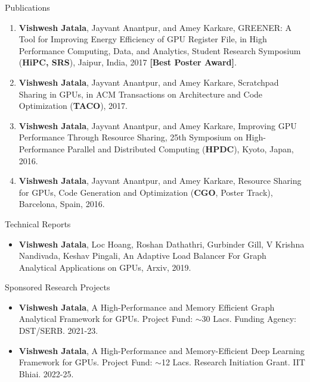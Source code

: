 \documentclass{resume} %
\begin{document}
\begin{rSection}{Publications}
\begin{enumerate}
\item \textbf{Vishwesh Jatala}, Jayvant Anantpur, and Amey Karkare, GREENER: A Tool for Improving Energy Efficiency of GPU Register File, in High Performance Computing, Data, and Analytics, Student Research Symposium (\textbf{HiPC, SRS}), Jaipur, India, 2017 \textbf{[Best Poster Award]}. 
\item \textbf{Vishwesh Jatala}, Jayvant Anantpur, and Amey Karkare, Scratchpad Sharing in GPUs, in ACM Transactions on Architecture and Code Optimization (\textbf{TACO}), 2017. 
\item \textbf{Vishwesh Jatala}, Jayvant Anantpur, and Amey Karkare, Improving GPU Performance Through Resource Sharing, 25th Symposium on High-Performance Parallel and Distributed Computing (\textbf{HPDC}), Kyoto, Japan, 2016.
\item \textbf{Vishwesh Jatala}, Jayvant Anantpur, and Amey Karkare, Resource Sharing for GPUs, Code Generation and Optimization (\textbf{CGO}, Poster Track), Barcelona, Spain, 2016.
\end{enumerate}
\end{rSection}


\begin{rSection}{Technical Reports}
\begin{itemize}
\item \textbf{Vishwesh Jatala}, Loc Hoang, Roshan Dathathri, Gurbinder Gill, V Krishna Nandivada, Keshav Pingali, An Adaptive Load Balancer For Graph Analytical Applications on GPUs, Arxiv, 2019. 
\end{itemize}
\end{rSection}


\begin{rSection}{Sponsored Research Projects}
	\begin{itemize}
		\item \textbf{Vishwesh Jatala}, A High-Performance and Memory Efficient Graph Analytical Framework for GPUs. Project Fund: $\sim$30 Lacs. Funding Agency: DST/SERB. 2021-23.
		\item \textbf{Vishwesh Jatala}, A High-Performance and Memory-Efficient Deep Learning Framework for GPUs. Project Fund: $\sim$12 Lacs. Research Initiation Grant. IIT Bhiai. 2022-25.
	\end{itemize}
\end{rSection}
\end{document}
